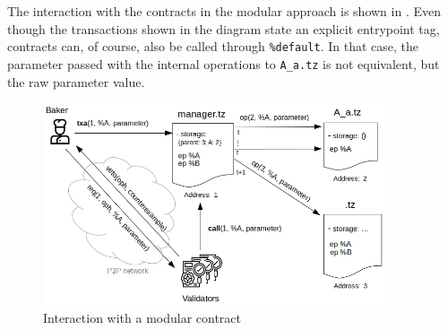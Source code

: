 The interaction with the contracts in the modular approach is shown in . Even though the transactions shown in the diagram state an explicit entrypoint tag, contracts can, of course, also be called through \texttt{\%default}. In that case, the parameter passed with the internal operations to \texttt{A\_a.tz} is not equivalent, but the raw parameter value.
\begin{figure}[h]
\centering
  \includegraphics[width=0.9\textwidth]{figures/4-offline_tezos/interaction_modular.jpg}
	\caption{Interaction with a modular contract}
	\label{fig:interaction_modular}
\end{figure}

